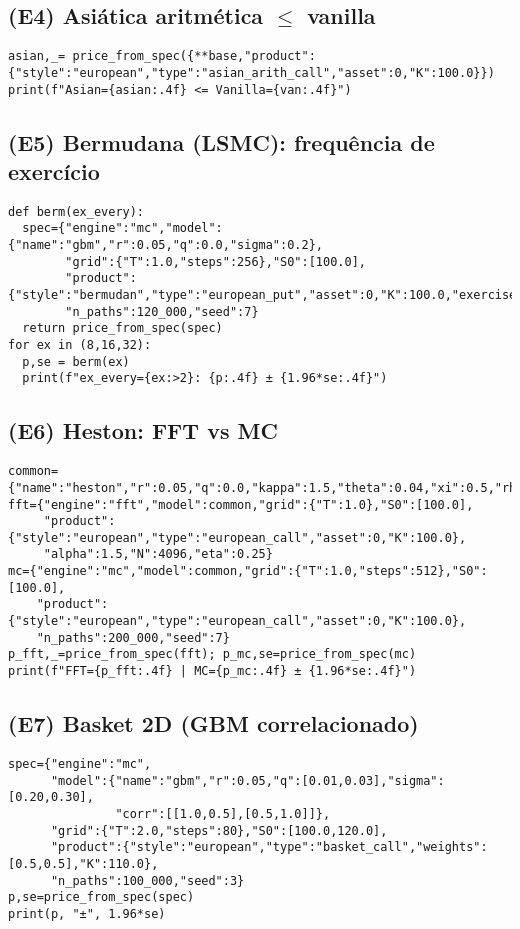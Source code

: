 ﻿\documentclass[11pt,a4paper]{article}
\begin{document}
\subsection{(E4) Asiática aritmética $\le$ vanilla}
\begin{lstlisting}[style=pystyle]
asian,_= price_from_spec({**base,"product":{"style":"european","type":"asian_arith_call","asset":0,"K":100.0}})
print(f"Asian={asian:.4f} <= Vanilla={van:.4f}")
\end{lstlisting}

\subsection{(E5) Bermudana (LSMC): frequência de exercício}
\begin{lstlisting}[style=pystyle]
def berm(ex_every):
  spec={"engine":"mc","model":{"name":"gbm","r":0.05,"q":0.0,"sigma":0.2},
        "grid":{"T":1.0,"steps":256},"S0":[100.0],
        "product":{"style":"bermudan","type":"european_put","asset":0,"K":100.0,"exercise_every":ex_every},
        "n_paths":120_000,"seed":7}
  return price_from_spec(spec)
for ex in (8,16,32):
  p,se = berm(ex)
  print(f"ex_every={ex:>2}: {p:.4f} ± {1.96*se:.4f}")
\end{lstlisting}

\subsection{(E6) Heston: FFT vs MC}
\begin{lstlisting}[style=pystyle]
common={"name":"heston","r":0.05,"q":0.0,"kappa":1.5,"theta":0.04,"xi":0.5,"rho":-0.7,"v0":0.04}
fft={"engine":"fft","model":common,"grid":{"T":1.0},"S0":[100.0],
     "product":{"style":"european","type":"european_call","asset":0,"K":100.0},
     "alpha":1.5,"N":4096,"eta":0.25}
mc={"engine":"mc","model":common,"grid":{"T":1.0,"steps":512},"S0":[100.0],
    "product":{"style":"european","type":"european_call","asset":0,"K":100.0},
    "n_paths":200_000,"seed":7}
p_fft,_=price_from_spec(fft); p_mc,se=price_from_spec(mc)
print(f"FFT={p_fft:.4f} | MC={p_mc:.4f} ± {1.96*se:.4f}")
\end{lstlisting}

\subsection{(E7) Basket 2D (GBM correlacionado)}
\begin{lstlisting}[style=pystyle]
spec={"engine":"mc",
      "model":{"name":"gbm","r":0.05,"q":[0.01,0.03],"sigma":[0.20,0.30],
               "corr":[[1.0,0.5],[0.5,1.0]]},
      "grid":{"T":2.0,"steps":80},"S0":[100.0,120.0],
      "product":{"style":"european","type":"basket_call","weights":[0.5,0.5],"K":110.0},
      "n_paths":100_000,"seed":3}
p,se=price_from_spec(spec)
print(p, "±", 1.96*se)
\end{lstlisting}
\end{document}
